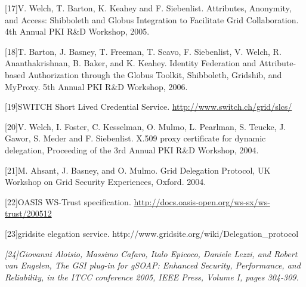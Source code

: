 \documentclass{article}
\newcommand\textstyleCitation[1]{\textit{#1}}
\begin{document}
[17]V. Welch, T. Barton, K. Keahey and F. Siebenlist. Attributes,
Anonymity, and Access: Shibboleth and Globus Integration to Facilitate
Grid Collaboration. 4th Annual PKI R\&D Workshop, 2005. 

[18]T. Barton, J. Basney, T. Freeman, T. Scavo, F. Siebenlist, V. Welch,
R. Ananthakrishnan, B. Baker, and K. Keahey. Identity Federation and
Attribute-based Authorization through the Globus Toolkit, Shibboleth,
Gridshib, and MyProxy. 5th Annual PKI R\&D Workshop, 2006. 

[19]SWITCH Short Lived Credential Service.
\url{http://www.switch.ch/grid/slcs/}

[20]V. Welch, I. Foster, C. Kesselman, O. Mulmo, L. Pearlman, S. Teucke,
J. Gawor, S. Meder and F. Siebenlist. X.509 proxy certificate for
dynamic delegation, Proceeding of the 3rd Annual PKI R\&D Workshop,
2004.

[21]M. Ahsant, J. Basney, and O. Mulmo. Grid Delegation Protocol, UK
Workshop on Grid Security Experiences, Oxford. 2004.

[22]OASIS WS-Trust specification.
\url{http://docs.oasis-open.org/ws-sx/ws-trust/200512}

[23]gridsite elegation service.
http://www.gridsite.org/wiki/Delegation\_protocol

\textstyleCitation{\textup{[24]}}\textstyleCitation{\textup{Giovanni
Aloisio, Massimo Cafaro, Italo Epicoco, Daniele Lezzi, and Robert van
Engelen, The GSI plug-in for gSOAP: Enhanced Security, Performance, and
Reliability, in the ITCC conference 2005, IEEE Press, Volume I, pages
304-309.}}


\bigskip


\bigskip


\bigskip


\bigskip


\bigskip
\end{document}

